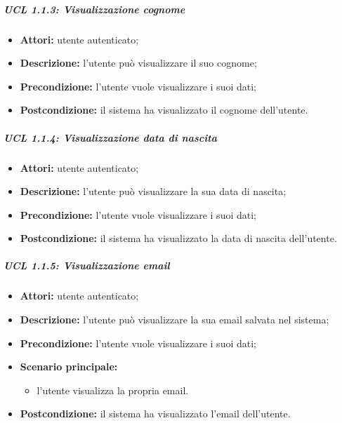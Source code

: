 \subparagraph{UCL 1.1.3: Visualizzazione cognome}
\begin{itemize}
	\item \textbf{Attori:} utente autenticato;
	\item \textbf{Descrizione:} l'utente può visualizzare il suo cognome;
	\item \textbf{Precondizione:} l'utente vuole visualizzare i suoi dati;
	\item \textbf{Postcondizione:} il sistema ha visualizzato il cognome dell'utente.
\end{itemize}

\subparagraph{UCL 1.1.4: Visualizzazione data di nascita}
\begin{itemize}
	\item \textbf{Attori:} utente autenticato;
	\item \textbf{Descrizione:} l'utente può visualizzare la sua data di nascita;
	\item \textbf{Precondizione:} l'utente vuole visualizzare i suoi dati;
	\item \textbf{Postcondizione:} il sistema ha visualizzato la data di nascita dell'utente.
\end{itemize}

\iffalse %
\subparagraph{UCL 1.1.5: Visualizzazione numero di telefono}
\begin{itemize}
	\item \textbf{Attori:} utente autenticato;
	\item \textbf{Descrizione:} l'utente può visualizzare il numero di telefono salvato nel sistema;
	\item \textbf{Precondizione:} l'utente vuole visualizzare i suoi dati;
	\item \textbf{Scenario principale:}
	\begin{itemize}
	 \item l'utente visualizza il proprio numero di telefono.
	\end{itemize}
	\item \textbf{Postcondizione:} il sistema ha visualizzato il numero di telefono dell'utente.
\end{itemize}
\fi

\subparagraph{UCL 1.1.5: Visualizzazione email}
\begin{itemize}
	\item \textbf{Attori:} utente autenticato;
	\item \textbf{Descrizione:} l'utente può visualizzare la sua email salvata nel sistema;
	\item \textbf{Precondizione:} l'utente vuole visualizzare i suoi dati;
	\item \textbf{Scenario principale:}
	\begin{itemize}
	 \item l'utente visualizza la propria email.
	\end{itemize}
	\item \textbf{Postcondizione:} il sistema ha visualizzato l'email dell'utente.
\end{itemize}

